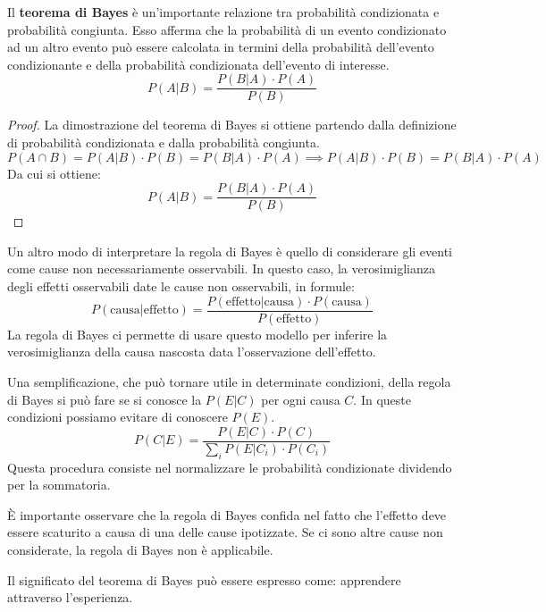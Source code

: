 \begin{definizione}
    Il \textbf{teorema di Bayes} è un'importante relazione tra probabilità
    condizionata e probabilità congiunta. Esso afferma che la probabilità di
    un evento condizionato ad un altro evento può essere calcolata in termini
    della probabilità dell'evento condizionante e della probabilità
    condizionata dell'evento di interesse.
    \begin{equation}
        P(A|B) = \frac{P(B|A) \cdot P(A)}{P(B)}
    \end{equation}
    \begin{proof}
        La dimostrazione del teorema di Bayes si ottiene partendo dalla
        definizione di probabilità condizionata e dalla probabilità congiunta.
        \begin{equation*}
            P(A \cap B) = P(A|B) \cdot P(B) = P(B|A) \cdot P(A) \implies  P(A|B) \cdot P(B) = P(B|A) \cdot P(A) 
        \end{equation*}
        Da cui si ottiene:
        \begin{equation*}
            P(A|B) = \frac{P(B|A) \cdot P(A)}{P(B)}
        \end{equation*}
    \end{proof}
\end{definizione}
Un altro modo di interpretare la regola di Bayes è quello di considerare
gli eventi come cause non necessariamente osservabili. In questo caso, la
verosimiglianza degli effetti osservabili date le cause non osservabili, in
formule:
\begin{equation*}
    P(\text{causa}|\text{effetto}) = \frac{P(\text{effetto}|\text{causa}) \cdot
        P(\text{causa})}{P(\text{effetto})}
\end{equation*}
La regola di Bayes ci permette di usare questo modello per inferire la
verosimiglianza della causa nascosta data l'osservazione dell'effetto.

Una semplificazione, che può tornare utile in determinate condizioni, della
regola di Bayes si può fare se si conosce la $P(E|C)$ per ogni causa $C$. In
queste condizioni possiamo evitare di conoscere $P(E)$.
\begin{equation}
    P(C|E) = \frac{P(E|C) \cdot P(C)}{\sum_{i} P(E|C_i) \cdot P(C_i)}
\end{equation}
Questa procedura consiste nel normalizzare le probabilità condizionate dividendo per 
la sommatoria.
\begin{nota}
    È importante osservare che la regola di Bayes confida nel fatto che l'effetto
    deve essere scaturito a causa di una delle cause ipotizzate. Se ci sono altre
    cause non considerate, la regola di Bayes non è applicabile.
\end{nota}
Il significato del teorema di Bayes può essere espresso come: apprendere
attraverso l'esperienza.

